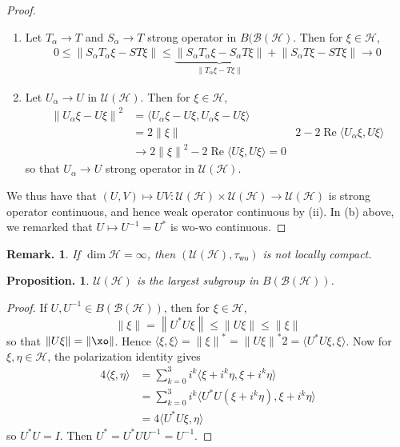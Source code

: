 \documentclass[11pt, a4paper]{memoir}
\newcommand{\norm}[1]{\ensuremath{\left\lVert#1\right\rVert}}
\theoremstyle{change}
\newtheorem{proposition}[theorem]{Proposition.}
\theoremstyle{plain}
\theoremstyle{nonumberplain}
\newtheorem{remark}{Remark.}
\newtheorem{proof}{Proof}
\renewcommand{\Re}{\ensuremath{\operatorname{Re}}}
\numberwithin{equation}{section}
\begin{document}
\begin{proof}
    \begin{enumerate}[nl,r]
        \item Let $T_\alpha \to T$ and $S_\alpha\to T$ strong operator in $B(\mathcal{B}(\mathcal{H})$.
            Then for $\xi\in\mathcal{H}$,
            \begin{align*}
                0\leq \norm{S_\alpha T_\alpha\xi-ST\xi}\leq\underbrace{\norm{S_\alpha T_\alpha\xi-S_\alpha T\xi}}_{\norm{T_\alpha\xi -T\xi}}+\norm{S_\alpha T\xi-ST\xi}\to 0
            \end{align*}
        \item Let $U_\alpha\to U$ in $\mathcal{U}(\mathcal{H})$.
            Then for $\xi\in\mathcal{H}$,
            \begin{align*}
                \norm{U_\alpha\xi-U\xi}^2 &= \langle U_\alpha\xi-U\xi,U_\alpha\xi-U\xi\rangle\\
                                          &= 2\norm{\xi}&2-2\Re\langle U_\alpha\xi,U\xi\rangle\\
                                          &\to 2\norm{\xi}^2-2\Re\langle U\xi,U\xi\rangle=0
            \end{align*}
            so that $U_\alpha\to U$ strong operator in $\mathcal{U}(\mathcal{H})$.
    \end{enumerate}
    We thus have that $(U,V)\mapsto UV:\mathcal{U}(\mathcal{H})\times\mathcal{U}(\mathcal{H})\to\mathcal{U}(\mathcal{H})$ is strong operator continuous, and hence weak operator continuous by (ii).
    In (b) above, we remarked that $U\mapsto U^{-1}=U^*$ is wo-wo continuous.
\end{proof}
\begin{remark}
    If $\dim\mathcal{H}=\infty$, then $(\mathcal{U}(\mathcal{H}),\tau_{\mathrm{wo}})$ is not locally compact.
\end{remark}
\begin{proposition}
    $\mathcal{U}(\mathcal{H})$ is the largest subgroup in $B(\mathcal{B}(\mathcal{H}))$.
\end{proposition}
\begin{proof}
    If $U,U^{-1}\in B(\mathcal{B}(\mathcal{H}))$, then for $\xi\in\mathcal{H}$,
    \begin{equation*}
        \norm{\xi}=\norm{U^*U\xi}\leq\norm{U\xi}\leq\norm{\xi}
    \end{equation*}
    so that $\norm{U\xi}=\norm{\xo}$.
    Hence $\langle\xi,\xi\rangle=\norm{\xi}^*=\norm{U\xi}^*2=\langle U^*U\xi,\xi\rangle$.
    Now for $\xi,\eta\in\mathcal{H}$, the polarization identity gives
    \begin{align*}
        4\langle\xi,\eta\rangle &= \sum_{k=0}^3i^k\langle\xi+i^k\eta,\xi+i^k\eta\rangle\\
                                &= \sum_{k=0}^3 i^k\langle U^*U(\xi+i^k\eta),\xi+i^k\eta\rangle\\
                                &= 4\langle U^*U\xi,\eta\rangle
    \end{align*}
    so $U^*U=I$.
    Then $U^*=U^*UU^{-1}=U^{-1}$.
\end{proof}
\end{document}

